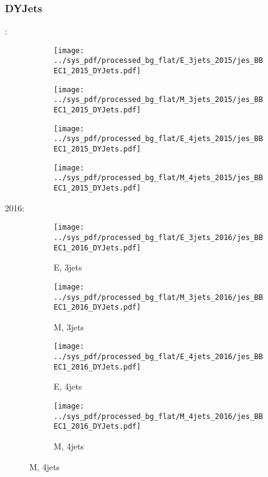 \documentclass{beamer}
\begin{document}
\begin{frame}
\frametitle{DYJets}
\fontsize{5}{1}:
\begin{figure}
\centering
\begin{subfigure}[b]{0.24\textwidth}
\texttt{[image: ../sys\_pdf/processed\_bg\_flat/E\_3jets\_2015/jes\_BBEC1\_2015\_DYJets.pdf]}
\end{subfigure}
\begin{subfigure}[b]{0.24\textwidth}
\texttt{[image: ../sys\_pdf/processed\_bg\_flat/M\_3jets\_2015/jes\_BBEC1\_2015\_DYJets.pdf]}
\end{subfigure}
\begin{subfigure}[b]{0.24\textwidth}
\texttt{[image: ../sys\_pdf/processed\_bg\_flat/E\_4jets\_2015/jes\_BBEC1\_2015\_DYJets.pdf]}
\end{subfigure}
\begin{subfigure}[b]{0.24\textwidth}
\texttt{[image: ../sys\_pdf/processed\_bg\_flat/M\_4jets\_2015/jes\_BBEC1\_2015\_DYJets.pdf]}
\end{subfigure}
\end{figure}
2016:
\begin{figure}
\centering
\begin{subfigure}[b]{0.24\textwidth}
\texttt{[image: ../sys\_pdf/processed\_bg\_flat/E\_3jets\_2016/jes\_BBEC1\_2016\_DYJets.pdf]}
\captionsetup{font=tiny}
\caption{E, 3jets}
\end{subfigure}
\begin{subfigure}[b]{0.24\textwidth}
\texttt{[image: ../sys\_pdf/processed\_bg\_flat/M\_3jets\_2016/jes\_BBEC1\_2016\_DYJets.pdf]}
\captionsetup{font=tiny}
\caption{M, 3jets}
\end{subfigure}
\begin{subfigure}[b]{0.24\textwidth}
\texttt{[image: ../sys\_pdf/processed\_bg\_flat/E\_4jets\_2016/jes\_BBEC1\_2016\_DYJets.pdf]}
\captionsetup{font=tiny}
\caption{E, 4jets}
\end{subfigure}
\begin{subfigure}[b]{0.24\textwidth}
\texttt{[image: ../sys\_pdf/processed\_bg\_flat/M\_4jets\_2016/jes\_BBEC1\_2016\_DYJets.pdf]}
\captionsetup{font=tiny}
\caption{M, 4jets}
\end{subfigure}
\end{figure}
\end{frame}
\end{document}
